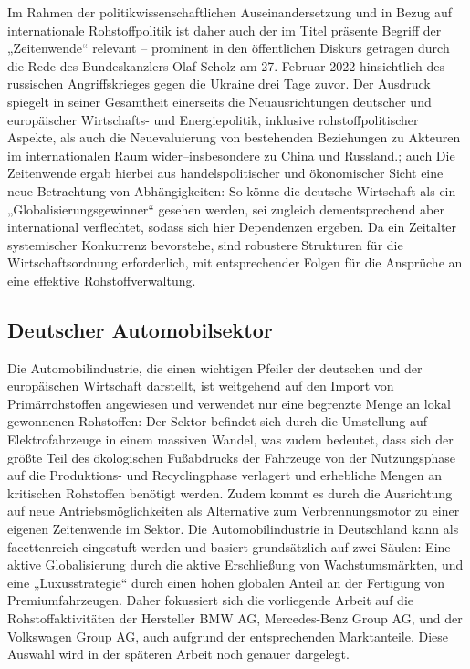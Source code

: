 \documentclass[12pt,a4paper,oneside]{book} %
\begin{document}
	Im Rahmen der politikwissenschaftlichen Auseinandersetzung und in Bezug auf internationale Rohstoffpolitik ist daher auch der im Titel präsente Begriff der „Zeitenwende“ relevant – prominent in den öffentlichen Diskurs getragen durch die Rede des Bundeskanzlers Olaf Scholz am 27. Februar 2022 hinsichtlich des russischen Angriffskrieges gegen die Ukraine drei Tage zuvor.\autocite{deutsche_bundesregierung_reden_2022} Der Ausdruck spiegelt in seiner Gesamtheit einerseits die Neuausrichtungen deutscher und europäischer Wirtschafts- und Energiepolitik, inklusive rohstoffpolitischer Aspekte, als auch die Neuevaluierung von bestehenden Beziehungen zu Akteuren im internationalen Raum wider--insbesondere zu China und Russland.\autocite[siehe auch][Rn. 741-746]{moser_zeitenwende_2022}; auch \autocite{[695-701]schaffer_ausenwirtschaftsrecht_2023} Die Zeitenwende ergab hierbei aus handelspolitischer und ökonomischer Sicht eine neue Betrachtung von Abhängigkeiten: So könne die deutsche Wirtschaft als ein „Globalisierungsgewinner“ gesehen werden, sei zugleich dementsprechend aber international verflechtet, sodass sich hier Dependenzen ergeben.\autocite{machnig_zeitenwende_2023} Da ein Zeitalter systemischer Konkurrenz bevorstehe, sind robustere Strukturen für die Wirtschaftsordnung erforderlich,\autocite{europaische_kommission_globale_2015} mit entsprechender Folgen für die Ansprüche an eine effektive Rohstoffverwaltung.

\subsection{Deutscher Automobilsektor}
Die Automobilindustrie, die einen wichtigen Pfeiler der deutschen und der europäischen Wirtschaft darstellt, ist weitgehend auf den Import von Primärrohstoffen angewiesen und verwendet nur eine begrenzte Menge an lokal gewonnenen Rohstoffen: Der Sektor befindet sich durch die Umstellung auf Elektrofahrzeuge in einem massiven Wandel, was zudem bedeutet, dass sich der größte Teil des ökologischen Fußabdrucks der Fahrzeuge von der Nutzungsphase auf die Produktions- und Recyclingphase verlagert und erhebliche Mengen an kritischen Rohstoffen benötigt werden. Zudem kommt es durch die Ausrichtung auf neue Antriebsmöglichkeiten als Alternative zum Verbrennungsmotor zu einer eigenen Zeitenwende im Sektor. Die Automobilindustrie in Deutschland kann als facettenreich eingestuft werden und basiert grundsätzlich auf zwei Säulen: Eine aktive Globalisierung durch die aktive Erschließung von Wachstumsmärkten, und eine „Luxusstrategie“ durch einen hohen globalen Anteil an der Fertigung von Premiumfahrzeugen.\autocite[3ff.]{puls_geschaftsmodell_2021} Daher fokussiert sich die vorliegende Arbeit auf die Rohstoffaktivitäten der Hersteller BMW AG, Mercedes-Benz Group AG, und der Volkswagen Group AG, auch aufgrund der entsprechenden Marktanteile. Diese Auswahl wird in der späteren Arbeit noch genauer dargelegt. 
\end{document}
